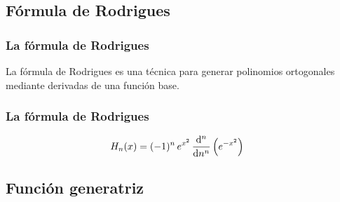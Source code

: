 \documentclass[12pt]{beamer}
\begin{document}
\subsection{Fórmula de Rodrigues}

\begin{frame}
\frametitle{La fórmula de Rodrigues}
La fórmula de Rodrigues es una técnica para generar polinomios ortogonales mediante derivadas de una función base. 
\end{frame}
\begin{frame}
\frametitle{La fórmula de Rodrigues}
\begin{align*}
H_{n} (x) &= (-1)^{n} \, e^{x^{2}} \, \dv[n]{n} \left( e^{-x^{2}} \right)
\end{align*}
\end{frame}

\subsection{Función generatriz}
\end{document}
